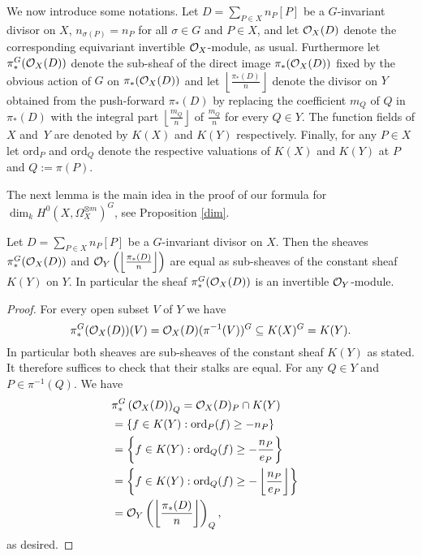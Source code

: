 We now introduce some notations. 
Let $D=\sum_{P\in X}n_P[P]$ be a $G$-invariant divisor on $X$, \ie $n_{\sigma(P)} = n_P$ for all $\sigma \in G$ and $P\in X$, and let ${\cal O}_X(D)$ denote the corresponding equivariant invertible ${\cal O}_X$-module, as usual. 
Furthermore let $\pi_*^G({\cal O}_X(D))$ denote the sub-sheaf of the direct image $\pi_*({\cal O}_X(D))$ fixed by the obvious action of $G$ on $\pi_*({\cal O}_X(D))$ and let $\left\lfloor \frac{\pi_*(D)}{n}
\right \rfloor$ denote the divisor on $Y$ obtained from the push-forward $\pi_*(D)$ by replacing the coefficient $m_Q$ of $Q$ in $\pi_*(D)$ with the integral part $\left \lfloor \frac{m_Q}{n} \right \rfloor$ of $\frac{m_Q}{n}$ for every $Q \in Y$. 
The function fields of $X$ and~$Y$ are denoted by $K(X)$ and $K(Y)$ respectively. 
Finally, for any $P \in X$ let $\textrm{ord}_P$ and $\textrm{ord}_Q$ denote the respective valuations of $K(X)$ and $K(Y)$ at $P$ and $Q:=\pi(P)$.



The next lemma is the main idea in the proof of our formula for $\dim_kH^0(X,\Omega_X^{\otimes m})^G$, see Proposition \ref{dim}. 



    \begin{lem}
    Let $D=\sum_{P\in X}n_P[P]$ be a $G$-invariant divisor on $X$.
    Then the sheaves $\pi_*^G({\cal O}_X(D))$ and ${\cal O}_Y\left(\left\lfloor \frac{\pi_*(D)}{n}\right \rfloor\right)$ are equal as sub-sheaves of the constant sheaf $K(Y)$ on $Y$. 
    In particular the sheaf $\pi_*^G({\cal O}_X(D))$ is an invertible ${\cal O}_Y$-module.
    \end{lem}
    \begin{proof}
    For every open subset $V$ of $Y$ we have 
        \[
        \pi_*^G({\cal O}_X(D))(V) = {\cal O}_X(D) (\pi^{-1}(V))^G \subseteq K(X)^G = K(Y).
        \]
    In particular both sheaves are sub-sheaves of the constant sheaf $K(Y)$ as stated. 
    It therefore suffices to check that their stalks are equal. 
    For any $Q \in Y$ and $P \in \pi^{-1}(Q)$.
    We have
        \begin{align*}
        \lefteqn{\pi_*^G\left(\cO_X(D)\right)_Q = \cO_X(D)_P \cap K(Y)}\\
        &= \left\{f \in K(Y): \textrm{ord}_P(f) \ge -n_P\right\}\\
        &= \left\{f \in K(Y): \textrm{ord}_Q(f) \ge - \frac{n_P}{e_P}\right\}\\
        &= \left\{ f \in K(Y): \textrm{ord}_Q(f) \ge - \left\lfloor\frac{n_P}{e_P} \right\rfloor \right\}\\
        &= \cO_Y\left(\left\lfloor \frac{\pi_*(D)}{n} \right\rfloor\right)_Q,
        \end{align*}
    as desired.
    \end{proof}

